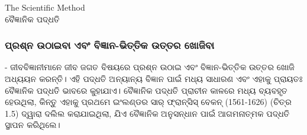 \documentclass{beamer}
\begin{document}
\begin{frame}
    \begin{center}
        \color{Orange}\Huge The Scientific Method\\
        \vspace{0.5cm}
        \color{Blue}\large \oriyafont ବୈଜ୍ଞାନିକ ପଦ୍ଧତି
    \end{center}
\end{frame}

\begin{frame}
    \frametitle{\color{Orange}\oriyafont ପ୍ରଶ୍ନ ଉଠାଇବା  ଏବଂ ବିଜ୍ଞାନ-ଭିତ୍ତିକ ଉତ୍ତର ଖୋଜିବା }

 
- \color{Black} \oriyafont ଜୀବବିଜ୍ଞାନୀମାନେ ଜୀବ ଜଗତ ବିଷୟରେ ପ୍ରଶ୍ନ ଉଠାଇ ଏବଂ ବିଜ୍ଞାନ-ଭିତ୍ତିକ ଉତ୍ତର ଖୋଜି ଅଧ୍ୟୟନ କରନ୍ତି। ଏହି ପଦ୍ଧତି ଅନ୍ୟାନ୍ୟ ବିଜ୍ଞାନ ପାଇଁ ମଧ୍ୟ ସାଧାରଣ ଏବଂ ଏହାକୁ ପ୍ରାୟତଃ ବୈଜ୍ଞାନିକ ପଦ୍ଧତି ଭାବରେ କୁହାଯାଏ। ବୈଜ୍ଞାନିକ ପଦ୍ଧତି ପ୍ରାଚୀନ କାଳରେ ମଧ୍ୟ ବ୍ୟବହୃତ ହେଉଥିଲା, କିନ୍ତୁ ଏହାକୁ ପ୍ରଥମେ ଇଂଲଣ୍ଡର ସାର୍ ଫ୍ରାନ୍ସିସ୍ ବେକନ୍ (1561-1626) (ଚିତ୍ର 1.5) ଦ୍ୱାରା ଦଲିଲ କରାଯାଇଥିଲା, ଯିଏ ବୈଜ୍ଞାନିକ ଅନୁସନ୍ଧାନ ପାଇଁ ଆଗମନାତ୍ମକ ପଦ୍ଧତି ସ୍ଥାପନ କରିଥିଲେ।


\end{frame}

\end{document}
